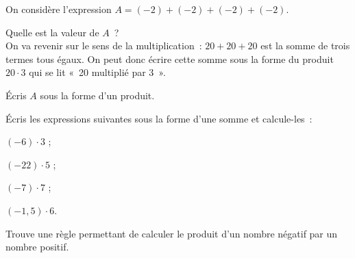 \begin{activite} \label{MultDivRelatifs_acti1}

On considère l'expression $A = (-2) + (-2) + (-2) + (-2)$.

\begin{partie}
Quelle est la valeur de $A$ ? \\[0.5em]
On va revenir sur le sens de la multiplication : $20 + 20 + 20$ est la somme de trois termes tous égaux. On peut donc écrire cette somme sous la forme du produit $20 \cdot 3$ qui se lit « 20 multiplié par 3 ».
\end{partie}

\begin{partie}
Écris $A$ sous la forme d'un produit.
 \end{partie}
 
\begin{partie} 
Écris les expressions suivantes sous la forme d'une somme et calcule-les :
 \begin{colenumerate}{4}
  \item $(-6) \cdot 3$ ;
  \item $(-22) \cdot 5$ ;
  \item $(-7) \cdot 7$ ;
  \item $(-1,5) \cdot 6$.
  \end{colenumerate}
 \end{partie}
 
\begin{partie} \label{MultDivRelatifs_acti2}
Trouve une règle permettant de calculer le produit d'un nombre négatif par un nombre positif.
 \end{partie}

\end{activite}


